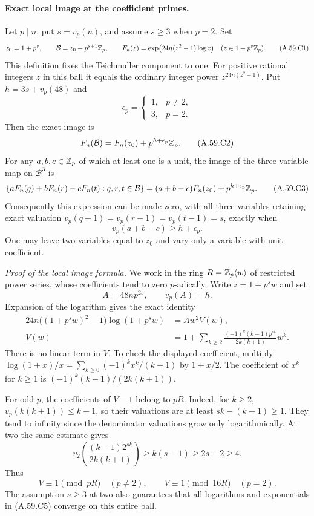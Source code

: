 \paragraph{Exact local image at the coefficient primes.}
Let $p\mid n$, put $s=v_p(n)$, and assume $s\ge3$ when
$p=2$.  Set
\[
 z_0=1+p^s,\qquad
 \mathcal B=z_0+p^{s+1}\mathbb Z_p,\qquad
 F_n(z)=\exp\bigl(24n(z^2-1)\log z\bigr)
                   \quad(z\in1+p^s\mathbb Z_p).
\tag{A.59.C1}
\]
This definition fixes the Teichmuller component to one.
For positive rational integers $z$ in this ball it equals
the ordinary integer power $z^{24n(z^2-1)}$.
Put $h=3s+v_p(48)$ and
\[
 \epsilon_p=\begin{cases}1,&p\ne2,\\3,&p=2.\end{cases}
\]
Then the exact image is
\[
                 F_n(\mathcal B)
                   =F_n(z_0)+p^{h+\epsilon_p}\mathbb Z_p.
\tag{A.59.C2}
\]
For any $a,b,c\in\mathbb Z_p$ of which at least one is a unit,
the image of the three-variable map on $\mathcal B^3$ is
\[
 \{aF_n(q)+bF_n(r)-cF_n(t):q,r,t\in\mathcal B\}
       =(a+b-c)F_n(z_0)+p^{h+\epsilon_p}\mathbb Z_p.
\tag{A.59.C3}
\]
Consequently this expression can be made zero, with all
three variables retaining exact valuation
$v_p(q-1)=v_p(r-1)=v_p(t-1)=s$, exactly when
\[
                         v_p(a+b-c)\ge h+\epsilon_p.
\tag{A.59.C4}
\]
One may leave two variables equal to $z_0$ and vary only
a variable with unit coefficient.

\emph{Proof of the local image formula.}
We work in the ring $R=\mathbb Z_p\langle w\rangle$ of restricted
power series, whose coefficients tend to zero $p$-adically.
Write $z=1+p^s w$ and set
\[
 A=48np^{2s},\qquad v_p(A)=h.
\]
Expansion of the logarithm gives the exact identity
\[
 \begin{split}
 24n\bigl((1+p^s w)^2-1\bigr)\log(1+p^s w)
      &=A w^2V(w),\\
 V(w)&=1+\sum_{k\ge2}
       \frac{(-1)^k(k-1)p^{sk}}{2k(k+1)}w^k.
 \end{split}
\tag{A.59.C5}
\]
There is no linear term in $V$.  To check the displayed
coefficient, multiply
$\log(1+x)/x=\sum_{k\ge0}(-1)^kx^k/(k+1)$ by
$1+x/2$.  The coefficient of $x^k$ for $k\ge1$ is
$(-1)^k(k-1)/(2k(k+1))$.

For odd $p$, the coefficients of $V-1$ belong to $pR$.
Indeed, for $k\ge2$,
$v_p(k(k+1))\le k-1$, so their valuations are at least
$sk-(k-1)\ge1$.  They tend to infinity since the
denominator valuations grow only logarithmically.
At two the same estimate gives
\[
      v_2\left(\frac{(k-1)2^{sk}}{2k(k+1)}\right)
          \ge k(s-1)\ge2s-2\ge4.
\]
Thus
\[
 V\equiv1\pmod{pR}\quad(p\ne2),\qquad
 V\equiv1\pmod{16R}\quad(p=2).
\tag{A.59.C6}
\]
The assumption $s\ge3$ at two also guarantees that all
logarithms and exponentials in (A.59.C5) converge on this
entire ball.

